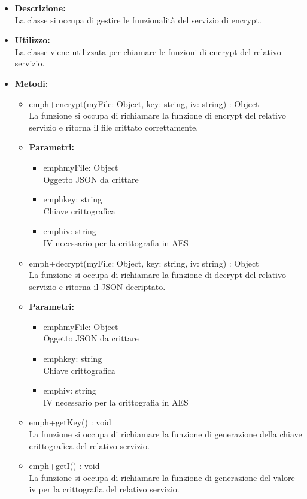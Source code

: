         \begin{itemize}
          \item \textbf{Descrizione: }\\
          La classe si occupa di gestire le funzionalità del servizio di encrypt.
          \item \textbf{Utilizzo: }\\
          La classe viene utilizzata per chiamare le funzioni di encrypt del relativo servizio.
          \item \textbf{Metodi:}\\
          \begin{itemize}
            \item emph{+encrypt(myFile: Object, key: string, iv: string) : Object}\\
            La funzione si occupa di richiamare la funzione di encrypt del relativo servizio e ritorna il file crittato correttamente.
            \item \textbf{Parametri: }\\
            \begin{itemize}
              \item emph{myFile: Object}\\
              Oggetto JSON da crittare
              \item emph{key: string}\\
              Chiave crittografica
              \item emph{iv: string}\\
              IV necessario per la crittografia in AES
            \end{itemize}
            \item emph{+decrypt(myFile: Object, key: string, iv: string) : Object}\\
            La funzione si occupa di richiamare la funzione di decrypt del relativo servizio e ritorna il JSON decriptato.
            \item \textbf{Parametri: }\\
            \begin{itemize}
              \item emph{myFile: Object}\\
              Oggetto JSON da crittare
              \item emph{key: string}\\
              Chiave crittografica
              \item emph{iv: string}\\
              IV necessario per la crittografia in AES
            \end{itemize}
            \item emph{+getKey() : void}\\
            La funzione si occupa di richiamare la funzione di generazione della chiave crittografica del relativo servizio.
            \item emph{+getI() : void}\\
            La funzione si occupa di richiamare la funzione di generazione del valore iv per la crittografia del relativo servizio.
          \end{itemize}
        \end{itemize}
